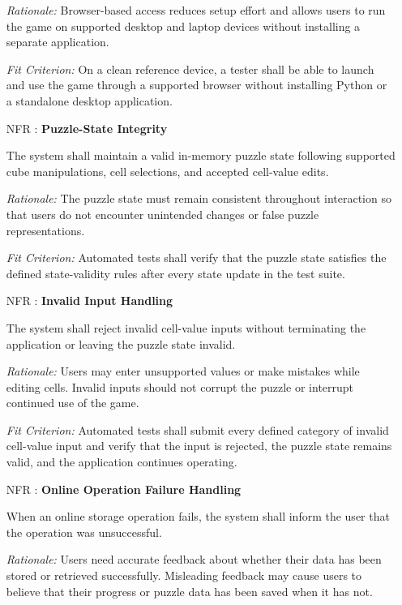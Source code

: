 \documentclass[12pt]{article}
\newcounter{nfrnum} %
\begin{document}
\begin{itemize}
\textit{Rationale:} Browser-based access reduces setup effort
and allows users to run the game on supported desktop and
laptop devices without installing a separate application.

\textit{Fit Criterion:} On a clean reference device, a tester
shall be able to launch and use the game through a supported
browser without installing Python or a standalone desktop
application.



\item[NFR\refstepcounter{nfrnum}\thenfrnum
\label{NFR_11}:]
\textbf{Puzzle-State Integrity}

The system shall maintain a valid in-memory puzzle state
following supported cube manipulations, cell selections, and
accepted cell-value edits.

\textit{Rationale:} The puzzle state must remain consistent
throughout interaction so that users do not encounter
unintended changes or false puzzle representations.

\textit{Fit Criterion:} Automated tests shall verify that
the puzzle state satisfies the defined state-validity rules
after every state update in the test suite.


\item[NFR\refstepcounter{nfrnum}\thenfrnum
\label{NFR_12}:]
\textbf{Invalid Input Handling}

The system shall reject invalid cell-value inputs without
terminating the application or leaving the puzzle state invalid.

\textit{Rationale:} Users may enter unsupported values or
make mistakes while editing cells. Invalid inputs should
not corrupt the puzzle or interrupt continued use of the game.

\textit{Fit Criterion:} Automated tests shall submit every
defined category of invalid cell-value input and verify that
the input is rejected, the puzzle state remains valid, and
the application continues operating.


\item[NFR\refstepcounter{nfrnum}\thenfrnum
\label{NFR_13}:]
\textbf{Online Operation Failure Handling}

When an online storage operation fails, the system shall
inform the user that the operation was unsuccessful.

\textit{Rationale:} Users need accurate feedback about
whether their data has been stored or retrieved successfully.
Misleading feedback may cause users to believe that their
progress or puzzle data has been saved when it has not.


\end{itemize}
\end{document}
